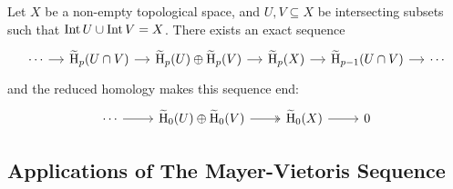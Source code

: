 \begin{corollary}
    \label{cor:mayer-vietoris-for-reduced-homology}
    Let \(X\) be a non-empty topological space, and \(U, V \subseteq X\) be intersecting
    subsets such that \(\operatorname{Int} U \cup \operatorname{Int} V = X\). There exists an exact sequence
    \[
        \begin{tikzcd}[column sep=small]
            \cdots \ar[r]
            &\rHmlg_p(U \cap V) \ar[r]
            &\rHmlg_p(U) \oplus \rHmlg_p(V) \ar[r]
            &\rHmlg_p(X) \ar[r]
            &\rHmlg_{p-1}(U \cap V) \ar[r]
            &\cdots
        \end{tikzcd}
    \]
    and the reduced homology makes this sequence end:
    \[
        \begin{tikzcd}
            \cdots \ar[r]
            &\rHmlg_0(U) \oplus \rHmlg_0(V) \ar[r, two heads]
            &\rHmlg_0(X) \ar[r]
            &0
        \end{tikzcd}
    \]
\end{corollary}

\subsection{Applications of The Mayer-Vietoris Sequence}


